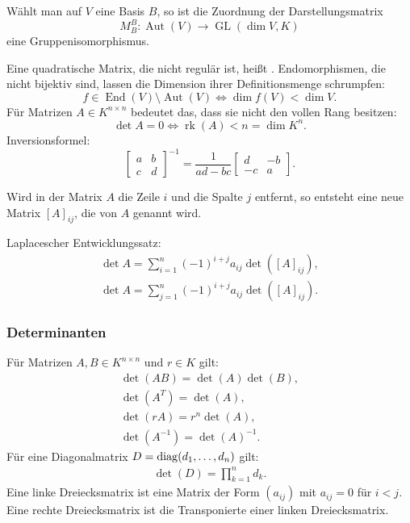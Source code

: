 Wählt man auf $V$ eine Basis
$B$, so ist die Zuordnung der Darstellungsmatrix
\begin{equation}
M_B^B\colon \operatorname{Aut}(V)\to\operatorname{GL}(\dim V,K)
\end{equation}
eine Gruppenisomorphismus.

Eine quadratische Matrix, die nicht regulär ist, heißt
. Endomorphismen, die nicht bijektiv sind, lassen
die Dimension ihrer Definitionsmenge schrumpfen:
\begin{equation}
f{\in}\operatorname{End}(V){\setminus}\operatorname{Aut}(V)
\Longleftrightarrow \dim f(V)<\dim V.
\end{equation}
Für Matrizen $A\in K^{n\times n}$ bedeutet das, dass sie nicht
den vollen Rang besitzen:
\begin{equation}
\det A=0\iff \operatorname{rk}(A) < n = \dim K^n.
\end{equation}
Inversionsformel:
\begin{equation}
\begin{bmatrix}
a & b\\
c & d
\end{bmatrix}^{-1}
= \frac{1}{ad-bc}\begin{bmatrix}
d & -b\\
-c & a
\end{bmatrix}.
\end{equation}
\begin{Definition}
Wird in der Matrix $A$ die Zeile $i$ und die Spalte $j$ entfernt,
so entsteht eine neue Matrix $[A]_{ij}$, die
von $A$ genannt wird.
\end{Definition}
Laplacescher Entwicklungssatz:
\begin{align}
\det A = \sum_{i=1}^n (-1)^{i+j}a_{ij}\det([A]_{ij}),\\
\det A = \sum_{j=1}^n (-1)^{i+j}a_{ij}\det([A]_{ij}).
\end{align}

\subsubsection{Determinanten}
Für Matrizen $A,B\in K^{n\times n}$ und $r\in K$ gilt:
\begin{gather}
\det(AB) = \det(A)\det(B),\\
\det(A^T) = \det(A),\\
\det(rA) = r^n\det(A),\\
\det(A^{-1}) = \det(A)^{-1}.
\end{gather}
Für eine Diagonalmatrix $D=\operatorname*{diag}(d_1,\ldots,d_n)$ gilt:
\begin{gather}
\det(D) = \prod_{k=1}^n d_k.
\end{gather}
Eine linke Dreiecksmatrix ist eine Matrix der Form
$(a_{ij})$ mit $a_{ij}=0$ für $i<j$. Eine rechte
Dreiecksmatrix ist die Transponierte einer linken
Dreiecksmatrix.


